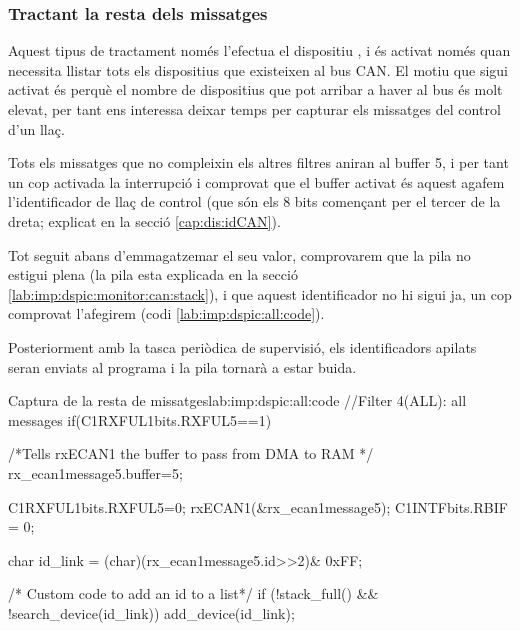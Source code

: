 \subsubsection{Tractant la resta dels missatges}\label{lab:imp:dspic:ALL_ID}

Aquest tipus de tractament només l'efectua el dispositiu \Monitor, i és activat només quan necessita llistar tots els dispositius que existeixen al bus CAN. El motiu que sigui activat és perquè el nombre de dispositius que pot arribar a haver al bus és molt elevat, per tant ens interessa deixar temps per capturar els missatges del control d'un llaç.

Tots els missatges que no compleixin els altres filtres aniran al buffer 5, i per tant un cop activada la interrupció i comprovat que el buffer activat és aquest agafem l'identificador de llaç de control (que són els 8 bits començant per el tercer de la dreta; explicat en la secció \ref{cap:dis:idCAN}).

Tot seguit abans d'emmagatzemar el seu valor, comprovarem que la pila no estigui plena (la pila esta explicada en la secció \ref{lab:imp:dspic:monitor:can:stack}), i que aquest identificador no hi sigui ja, un cop comprovat l'afegirem (codi \ref{lab:imp:dspic:all:code}).

Posteriorment amb la tasca periòdica de supervisió, els identificadors apilats seran enviats al programa \DCSMonitor i la pila tornarà a estar buida.

\begin{code_c}{Captura de la resta de missatges}{lab:imp:dspic:all:code}
//Filter 4(ALL): all messages
if(C1RXFUL1bits.RXFUL5==1)
{
	/*Tells rxECAN1 the buffer to pass from DMA to RAM */
	rx_ecan1message5.buffer=5;

	C1RXFUL1bits.RXFUL5=0;
	rxECAN1(&rx_ecan1message5);
	C1INTFbits.RBIF = 0;

	char id_link = (char)(rx_ecan1message5.id>>2)& 0xFF;

	/* Custom code to add an id to a list*/
	if (!stack_full() && !search_device(id_link))
		add_device(id_link);
}
\end{code_c}


